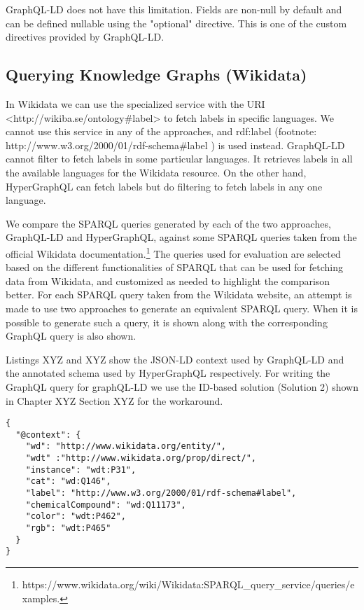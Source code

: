 GraphQL-LD does not have this limitation. Fields are non-null by default and can be defined nullable using the "optional" directive. This is one of the custom directives provided by GraphQL-LD.

\subsection{Querying Knowledge Graphs (Wikidata)}
In Wikidata we can use the specialized service with the URI <http://wikiba.se/ontology\#label> to fetch labels in specific languages. We cannot use this service in any of the approaches, and rdf:label (footnote:  http://www.w3.org/2000/01/rdf-schema\#label ) is used instead. GraphQL-LD cannot filter to fetch labels in some particular languages. It retrieves labels in all the available languages for the Wikidata resource. On the other hand, HyperGraphQL can fetch labels but do filtering to fetch labels in any one language. 

We compare the SPARQL queries generated by each of the two approaches, GraphQL-LD and HyperGraphQL, against some SPARQL queries taken from the official Wikidata documentation.\footnote{https://www.wikidata.org/wiki/Wikidata:SPARQL\_query\_service/queries/examples.} The queries used for evaluation are selected based on the different functionalities of SPARQL that can be used for fetching data from Wikidata, and customized as needed to highlight the comparison better. For each SPARQL query taken from the Wikidata website, an attempt is made to use two approaches to generate an equivalent SPARQL query. When it is possible to generate such a query, it is shown along with the corresponding GraphQL query is also shown.

Listings XYZ and XYZ show the JSON-LD context used by GraphQL-LD and the annotated schema used by HyperGraphQL respectively. For writing the GraphQL query for graphQL-LD we use the ID-based solution (Solution 2) shown in Chapter XYZ Section XYZ for the workaround.

\begin{minipage}{\linewidth}
\begin{lstlisting}[label=listing:listing34, caption={JSON-LD Context}]
{
  "@context": {
    "wd": "http://www.wikidata.org/entity/",
    "wdt" :"http://www.wikidata.org/prop/direct/",
    "instance": "wdt:P31",
    "cat": "wd:Q146",
    "label": "http://www.w3.org/2000/01/rdf-schema#label",
    "chemicalCompound": "wd:Q11173",
    "color": "wdt:P462",
    "rgb": "wdt:P465"
  }
}
\end{lstlisting}
\end{minipage}


